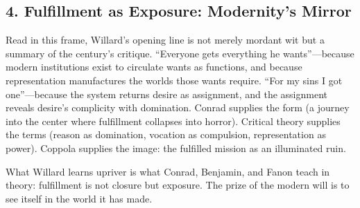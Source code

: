 \subsection*{4. Fulfillment as Exposure: Modernity's Mirror}
\label{ssec:4-fulfillment-as-exposure-modernity-s-mirror}
Read in this frame, Willard’s opening line is not merely mordant wit but a summary of the century’s critique. ``Everyone gets everything he wants''---because modern institutions exist to circulate wants as functions, and because representation manufactures the worlds those wants require. ``For my sins I got one''---because the system returns desire as assignment, and the assignment reveals desire’s complicity with domination. Conrad supplies the form (a journey into the center where fulfillment collapses into horror). Critical theory supplies the terms (reason as domination, vocation as compulsion, representation as power). Coppola supplies the image: the fulfilled mission as an illuminated ruin.

What Willard learns upriver is what Conrad, Benjamin, and Fanon teach in theory: fulfillment is not closure but exposure. The prize of the modern will is to see itself in the world it has made.
